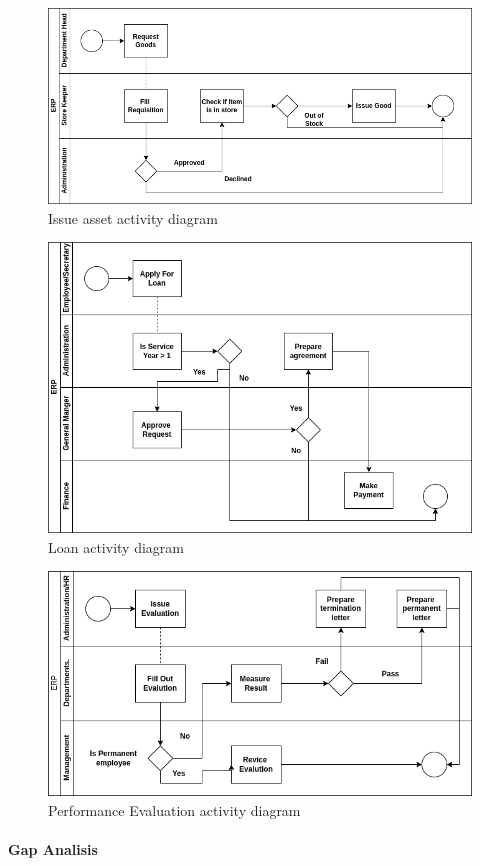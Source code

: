 \begin{figure}[!h]
\label{asset_activity_diagram}
\center
\includegraphics[width=15cm,keepaspectratio]{activity_diagrams/manage_asset_activity_diagram.drawio.png}
\caption{Issue asset activity diagram}
\end{figure} 

\begin{figure}[!h]
\label{loan_activity_diagram}
\center
\includegraphics[width=15cm,keepaspectratio]{activity_diagrams/loan_activity_diagram.drawio.png}
\caption{Loan activity diagram}
\end{figure}

\begin{figure}[!h]
\label{loan_activity_diagram}
\center
\includegraphics[width=15cm,keepaspectratio]{activity_diagrams/appraisal_activity_diagram.drawio.png}
\caption{Performance Evaluation activity diagram}
\end{figure}


\paragraph{Gap Analisis}